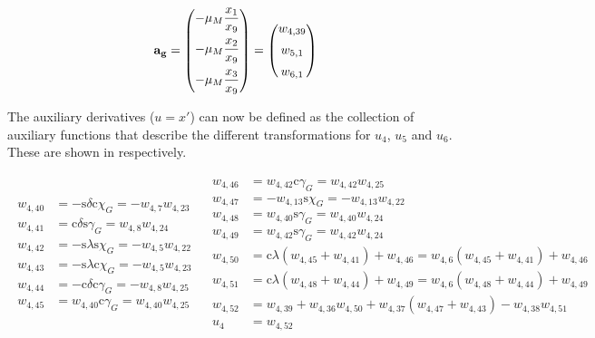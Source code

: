 \begin{equation} \label{eq:gravAuxF}
\mathbf{a_{g}} =
\begin{pmatrix}
-\mu_{M}\dfrac{x_{1}}{x_{9}} \vspace{5pt} \\ \vspace{5pt}
-\mu_{M}\dfrac{x_{2}}{x_{9}} \\
-\mu_{M}\dfrac{x_{3}}{x_{9}} \\
\end{pmatrix}
= 
\begin{pmatrix}
w_{4,39} \vspace{5pt} \\ \vspace{5pt}
w_{5,1} \\
w_{6,1} \\
\end{pmatrix}
\end{equation}

\noindent
The auxiliary derivatives ($u = x'$) can now be defined as the collection of auxiliary functions that describe the different transformations for $u_{4}$, $u_{5}$ and $u_{6}$. These are shown in  respectively. 

\begin{align} \label{eq:u4AuxF}
\begin{split}
w_{4,40} &= -\text{s}\delta \text{c}\chi_{G} = -w_{4,7}w_{4,23} \\
w_{4,41} &= \text{c}\delta	\text{s}\gamma_{G} = w_{4,8}w_{4,24}\\
w_{4,42} &= -\text{s}\lambda \text{s}\chi_{G} = -w_{4,5}w_{4,22}\\
w_{4,43} &= -\text{s}\lambda \text{c}\chi_{G} = -w_{4,5}w_{4,23} \\
w_{4,44} &= -\text{c}\delta \text{c}\gamma_{G} = -w_{4,8}w_{4,25} \\
w_{4,45} &= w_{4,40} \text{c}\gamma_{G} = w_{4,40}w_{4,25} \\
\end{split}
&
\begin{split}
w_{4,46} &= w_{4,42} \text{c}\gamma_{G} = w_{4,42}w_{4,25} \\
w_{4,47} &= -w_{4,13} \text{s}\chi_{G} = -w_{4,13}w_{4,22} \\
w_{4,48} &= w_{4,40} \text{s}\gamma_{G} = w_{4,40}w_{4,24} \\
w_{4,49} &= w_{4,42} \text{s}\gamma_{G} = w_{4,42}w_{4,24} \\
w_{4,50} &= \text{c}\lambda \left(w_{4,45}+w_{4,41} \right) + w_{4,46} = 
w_{4,6}\left(w_{4,45}+w_{4,41} \right) + w_{4,46} \\
w_{4,51} &= \text{c}\lambda \left(w_{4,48}+w_{4,44} \right) + w_{4,49} =
w_{4,6}\left(w_{4,48}+w_{4,44} \right) + w_{4,49} \\
w_{4,52} &= w_{4,39} +w_{4,36}w_{4,50}+w_{4,37}\left(w_{4,47}+w_{4,43}\right)-w_{4,38}w_{4,51} \\
u_{4} &= w_{4,52} \\
\end{split}
\end{align}

